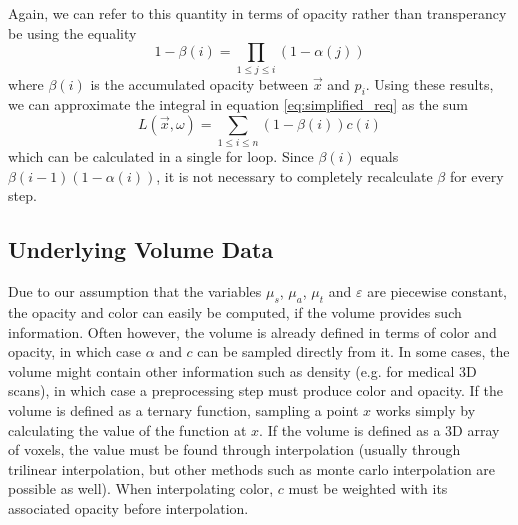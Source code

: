 Again, we can refer to this quantity in terms of opacity rather than transperancy be using the equality
\begin{equation}
1 - \beta(i) = \prod_{1 \le j \le i} (1 - \alpha(j))
\end{equation}
where $\beta(i)$ is the accumulated opacity between $\vec{x}$ and $p_i$.
Using these results, we can approximate the integral in equation \ref{eq:simplified_req} as the sum
\begin{equation} \label{eq:discrete_approximation}
L(\vec{x},\omega) = \sum_{1 \le i \le n}(1 - \beta(i))c(i)
\end{equation}
which can be calculated in a single for loop\cite{10.1145/147130.147155}. Since $\beta(i)$ equals $\beta(i-1)(1-\alpha(i))$, it is not necessary to completely recalculate $\beta$ for every step.


\subsection{Underlying Volume Data}
Due to our assumption that the variables $\mu_s$, $\mu_a$, $\mu_t$ and $\varepsilon$ are piecewise constant, the opacity and color can easily be computed, if the volume provides such information. Often however, the volume is already defined in terms of color and opacity, in which case $\alpha$ and $c$ can be sampled directly from it.
In some cases, the volume might contain other information such as density (e.g. for medical 3D scans), in which case a preprocessing step\cite{511} must produce color and opacity.
If the volume is defined as a ternary function, sampling a point $x$ works simply by calculating the value of the function at $x$. If the volume is defined as a 3D array of voxels, the value must be found through interpolation (usually through trilinear interpolation\cite{511}, but other methods such as monte carlo interpolation\cite{10.1145/3451256} are possible as well).
When interpolating color, $c$ must be weighted with its associated opacity before interpolation\cite{729595}.

